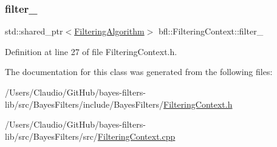 \subsubsection{\texorpdfstring{filter\+\_\+}{filter\_}}
{\footnotesize\ttfamily std\+::shared\+\_\+ptr$<$\mbox{\hyperlink{classbfl_1_1FilteringAlgorithm}{Filtering\+Algorithm}}$>$ bfl\+::\+Filtering\+Context\+::filter\+\_\+\hspace{0.3cm}{\ttfamily [private]}}



Definition at line 27 of file Filtering\+Context.\+h.



The documentation for this class was generated from the following files\+:\begin{DoxyCompactItemize}
\item 
/\+Users/\+Claudio/\+Git\+Hub/bayes-\/filters-\/lib/src/\+Bayes\+Filters/include/\+Bayes\+Filters/\mbox{\hyperlink{FilteringContext_8h}{Filtering\+Context.\+h}}\item 
/\+Users/\+Claudio/\+Git\+Hub/bayes-\/filters-\/lib/src/\+Bayes\+Filters/src/\mbox{\hyperlink{FilteringContext_8cpp}{Filtering\+Context.\+cpp}}\end{DoxyCompactItemize}
